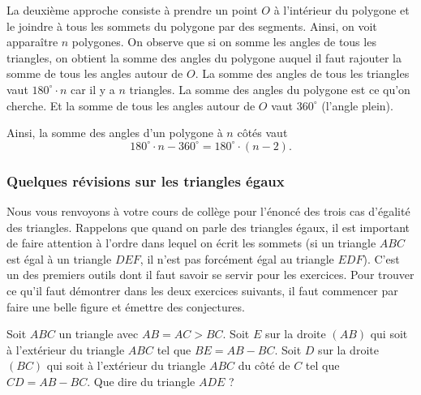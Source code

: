 \begin{preuve}
La deuxième approche consiste à prendre un point $O$ à l'intérieur du polygone et le joindre à tous les sommets du polygone par des segments.
\newline
Ainsi, on voit apparaître $n$ polygones. On observe que si on somme les angles de tous les triangles, on obtient la somme des angles du polygone auquel il faut rajouter la somme de tous les angles autour de $O$. La somme des angles de tous les triangles vaut $180^\circ\cdot n$ car il y a $n$ triangles. La somme des angles du polygone est ce qu'on cherche. Et la somme de tous les angles autour de $O$ vaut $360^\circ$ (l'angle plein).

Ainsi, la somme des angles d'un polygone à $n$ côtés vaut
\[
180^\circ \cdot n - 360^\circ = 180^\circ\cdot(n-2).
\]
\end{preuve}

\subsubsection{Quelques révisions sur les triangles égaux}
Nous vous renvoyons à votre cours de collège pour l'énoncé des trois cas d'égalité des triangles. Rappelons que quand on parle des triangles égaux, il est important de faire attention à l'ordre dans lequel on écrit les sommets (si un triangle $ABC$ est égal à un triangle $DEF$, il n'est pas forcément égal au triangle $EDF$). C'est un des premiers outils dont il faut savoir se servir pour les exercices. Pour trouver ce qu'il faut démontrer dans les deux exercices suivants, il faut commencer par faire une belle figure et émettre des conjectures.

\begin{exo}
Soit $ABC$ un triangle avec $AB=AC>BC$. Soit $E$ sur la droite
$(AB)$ qui soit à l'extérieur du triangle $ABC$ tel que $BE=AB-BC$. Soit
$D$ sur la droite $(BC)$ qui soit à l'extérieur du triangle $ABC$ du côté
de $C$ tel que $CD=AB-BC$. Que dire du triangle $ADE$ ?
\end{exo}

